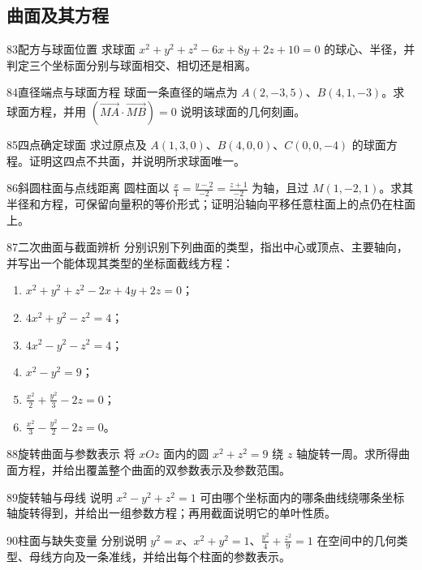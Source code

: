 \subsection{曲面及其方程}
\begin{exercise}{83}{配方与球面位置}
求球面 $x^2+y^2+z^2-6x+8y+2z+10=0$ 的球心、半径，并判定三个坐标面分别与球面相交、相切还是相离。
\end{exercise}
\begin{exercise}{84}{直径端点与球面方程}
球面一条直径的端点为 $A(2,-3,5)$、$B(4,1,-3)$。求球面方程，并用 $(\overrightarrow{MA}\cdot\overrightarrow{MB})=0$ 说明该球面的几何刻画。
\end{exercise}
\begin{exercise}{85}{四点确定球面}
求过原点及 $A(1,3,0)$、$B(4,0,0)$、$C(0,0,-4)$ 的球面方程。证明这四点不共面，并说明所求球面唯一。
\end{exercise}
\begin{exercise}{86}{斜圆柱面与点线距离}
圆柱面以 $\frac x1=\frac{y-2}{-2}=\frac{z+1}{-2}$ 为轴，且过 $M(1,-2,1)$。求其半径和方程，可保留向量积的等价形式；证明沿轴向平移任意柱面上的点仍在柱面上。
\end{exercise}
\begin{exercise}{87}{二次曲面与截面辨析}
分别识别下列曲面的类型，指出中心或顶点、主要轴向，并写出一个能体现其类型的坐标面截线方程：
\begin{enumerate}
\item $x^2+y^2+z^2-2x+4y+2z=0$；
\item $4x^2+y^2-z^2=4$；
\item $4x^2-y^2-z^2=4$；
\item $x^2-y^2=9$；
\item $\frac{x^2}2+\frac{y^2}3-2z=0$；
\item $\frac{x^2}3-\frac{y^2}2-2z=0$。
\end{enumerate}
\end{exercise}
\begin{exercise}{88}{旋转曲面与参数表示}
将 $xOz$ 面内的圆 $x^2+z^2=9$ 绕 $z$ 轴旋转一周。求所得曲面方程，并给出覆盖整个曲面的双参数表示及参数范围。
\end{exercise}
\begin{exercise}{89}{旋转轴与母线}
说明 $x^2-y^2+z^2=1$ 可由哪个坐标面内的哪条曲线绕哪条坐标轴旋转得到，并给出一组参数方程；再用截面说明它的单叶性质。
\end{exercise}
\begin{exercise}{90}{柱面与缺失变量}
分别说明 $y^2=x$、$x^2+y^2=1$、$\frac{y^2}4+\frac{z^2}9=1$ 在空间中的几何类型、母线方向及一条准线，并给出每个柱面的参数表示。
\end{exercise}

